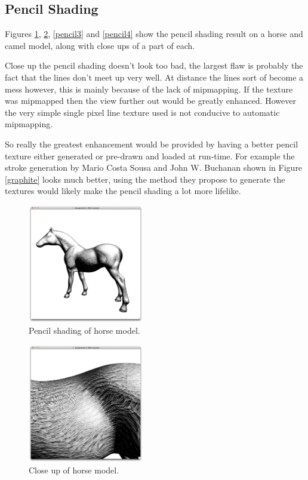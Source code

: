   \subsection{Pencil Shading}

      Figures \ref{pencil1}, \ref{pencil2}, \ref{pencil3} and \ref{pencil4} show
      the pencil shading result on a horse and camel model, along with close ups
      of a part of each.

      Close up the pencil shading doesn't look too bad, the largest flaw is
      probably the fact that the lines don't meet up very well.  At distance the
      lines sort of become a mess however, this is mainly because of the lack of
      mipmapping.  If the texture was mipmapped then the view further out would
      be greatly enhanced.  However the very simple single pixel line texture
      used is not conducive to automatic mipmapping.

      So really the greatest enhancement would be provided by having a better
      pencil texture either generated or pre-drawn and loaded at run-time.  For
      example the stroke generation by Mario Costa Sousa and John W. Buchanan
      \cite{graphite} shown in Figure \ref{graphite} looks much better, using
      the method they propose to generate the textures would likely make the
      pencil shading a lot more lifelike.

    \begin{figure}
      \centering
      \includegraphics[width=0.45\textwidth]{images/pencil-1}
      \caption{Pencil shading of horse model.}
      \label{pencil1}
    \end{figure}

    \begin{figure}
      \centering
      \includegraphics[width=0.45\textwidth]{images/pencil-2}
      \caption{Close up of horse model.}
      \label{pencil2}
    \end{figure}

